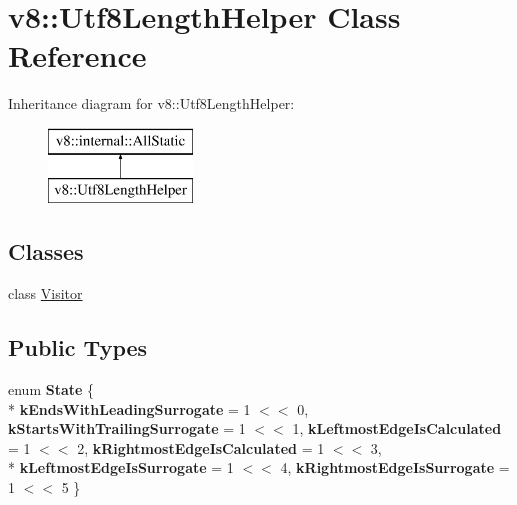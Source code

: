 \hypertarget{classv8_1_1_utf8_length_helper}{}\section{v8\+:\+:Utf8\+Length\+Helper Class Reference}
\label{classv8_1_1_utf8_length_helper}
Inheritance diagram for v8\+:\+:Utf8\+Length\+Helper\+:\begin{figure}[H]
\begin{center}
\leavevmode
\includegraphics[height=2.000000cm]{classv8_1_1_utf8_length_helper}
\end{center}
\end{figure}
\subsection*{Classes}
\begin{DoxyCompactItemize}
\item 
class \hyperlink{classv8_1_1_utf8_length_helper_1_1_visitor}{Visitor}
\end{DoxyCompactItemize}
\subsection*{Public Types}
\begin{DoxyCompactItemize}
\item 
\hypertarget{classv8_1_1_utf8_length_helper_a964fff2270978f2926b768f2aa5d0623}{}enum {\bfseries State} \{ \\*
{\bfseries k\+Ends\+With\+Leading\+Surrogate} = 1 $<$$<$ 0, 
{\bfseries k\+Starts\+With\+Trailing\+Surrogate} = 1 $<$$<$ 1, 
{\bfseries k\+Leftmost\+Edge\+Is\+Calculated} = 1 $<$$<$ 2, 
{\bfseries k\+Rightmost\+Edge\+Is\+Calculated} = 1 $<$$<$ 3, 
\\*
{\bfseries k\+Leftmost\+Edge\+Is\+Surrogate} = 1 $<$$<$ 4, 
{\bfseries k\+Rightmost\+Edge\+Is\+Surrogate} = 1 $<$$<$ 5
 \}\label{classv8_1_1_utf8_length_helper_a964fff2270978f2926b768f2aa5d0623}

\end{DoxyCompactItemize}
